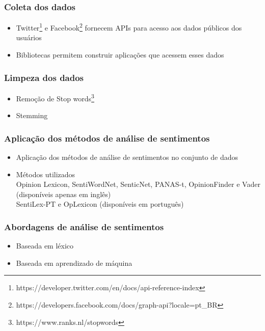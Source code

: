 \documentclass{beamer}
\begin{document}
\begin{frame}%
\frametitle{\textbf{Coleta dos dados}\transdissolve}%
\begin{itemize}%
\item<1->Twitter\footnote[1]{https://developer.twitter.com/en/docs/api-reference-index} e Facebook\footnote[2]{https://developers.facebook.com/docs/graph-api?locale=pt\_BR} fornecem APIs para acesso aos dados públicos dos usuários
\item<2->Bibliotecas permitem construir aplicações que acessem esses dados
\end{itemize}
\end{frame}

\begin{frame}%
\frametitle{\textbf{Limpeza dos dados}\transdissolve}%
\begin{itemize}
\item Remoção de Stop words\footnote[1]{https://www.ranks.nl/stopwords}
\item Stemming
\end{itemize}
\end{frame}


\begin{frame}%
\frametitle{\textbf{Aplicação dos métodos de análise de sentimentos}\transdissolve}%
\begin{itemize}
    \item Aplicação dos métodos de análise de sentimentos no conjunto de dados
    \item Métodos utilizados\\
        \qquad Opinion Lexicon, SentiWordNet, SenticNet, PANAS-t, OpinionFinder e Vader (disponíveis apenas em inglês)\\
        \qquad SentiLex-PT e OpLexicon (disponíveis em
        português)\\
\end{itemize}
\end{frame}

\begin{frame}%
\frametitle{\textbf{Abordagens de análise de sentimentos}\transdissolve}%
\begin{itemize}%
\item<1->Baseada em léxico
\item<2->Baseada em aprendizado de máquina
\end{itemize}
\end{frame}
\end{document}
